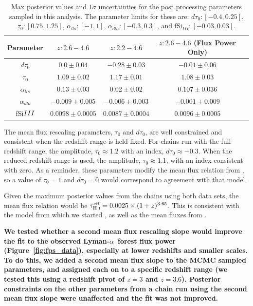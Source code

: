 \documentclass[a4paper,11pt]{article}
\newcommand{\lya}{Lyman-$\alpha$\ }
\begin{document}
\begin{table}[tbp]
	\centering
     \def\arraystretch{1.2}
     \begin{tabular}{|c|c|c|c|c|}
		\hline
		Parameter & $z: 2.6-4.6$ & $z: 2.2-4.6$ & $z: 2.6-4.6$ (Flux Power Only)\\
		\hline \hline
        $d\tau_0$ & $0.0\pm0.04$ & $-0.28\pm0.03$ & $-0.01\pm0.06$\\
    	  $\tau_0$ & $1.09\pm0.02$ & $1.17\pm0.01$ & $1.08\pm0.03$\\
        $\alpha_{lls}$ & $0.13\pm0.03$ & $0.02\pm0.02$ & $0.107\pm0.036$\\
        $\alpha_{dla}$ & $-0.009\pm0.005$ & $-0.006\pm0.003$ & $-0.001\pm0.009$\\
        fSi${\sc III}$ & $0.0098\pm0.0005$ & $0.0087\pm0.0004$ & $0.0096\pm0.0005$\\
        \hline
	\end{tabular}
    \caption{\label{table:post_par}
    Max posterior values and $1\sigma$ uncertainties for the post processing parameters sampled in this analysis. The parameter limits for these are: $d\tau_0: [-0.4, 0.25]$, $\tau_0: [0.75, 1.25]$, $\alpha_{lls}: [-1, 1]$, $\alpha_{dla}: [-0.3, 0.3]$, and fSi$_{III}: [-0.03, 0.03]$.
    }
\end{table}

The mean flux rescaling parameters, $\tau_0$ and $d\tau_0$, are well constrained and consistent when the redshift range is held fixed.
For chains run with the full redshift range, the amplitude, $\tau_0 \approx 1.2$ with an index, $d\tau_0 \approx -0.3$.
When the reduced redshift range is used, the amplitude, $\tau_0 \approx 1.1$, with an index consistent with zero.
As a reminder, these parameters modify the mean flux relation from \cite{2007MNRAS.382.1657K}, so a value of $\tau_0=1$ and $d\tau_0=0$ would correspond to agreement with that model.

Given the maximum posterior values from the chains using both data sets, the mean flux relation would be $\tau^{\text{eff}}_{\text{H~{\sc i}}} = 0.0025 \times (1+z)^{3.65}$.
This is consistent with the model from which we started \cite{2007MNRAS.382.1657K}, as well as the mean fluxes from \cite{2013MNRAS.430.2067B}.

\textbf{We tested whether a second mean flux rescaling slope would improve the fit to the observed \lya forest flux power (Figure~\ref{fig:fps_data}), especially at lower redshifts and smaller scales.
To do this, we added a second mean flux slope to the MCMC sampled parameters, and assigned each on to a specific redshift range (we tested this using a redshift pivot of $z=3$ and $z=3.6$).
Posterior constraints on the other parameters from a chain run using the second mean flux slope were unaffected and the fit was not improved.}
\end{document}
